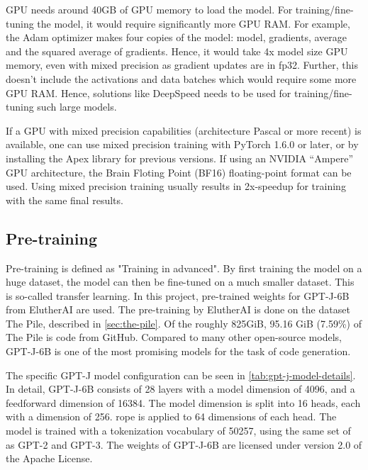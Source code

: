 GPU needs around 40GB of GPU memory to load the model. For training/fine-tuning the model, it would require significantly more GPU RAM. For example, the Adam optimizer makes four copies of the model: model, gradients, average and the squared average of gradients. Hence, it would take 4x model size GPU memory, even with mixed precision as gradient updates are in fp32. Further, this doesn't include the activations and data batches which would require some more GPU RAM. Hence, solutions like DeepSpeed needs to be used for training/fine-tuning such large models.

If a GPU with mixed precision capabilities (architecture Pascal or more recent) is available, one can use mixed precision training with PyTorch 1.6.0 or later, or by installing the Apex library for previous versions. If using an NVIDIA “Ampere” GPU architecture, the Brain Floting Point (BF16) floating-point format can be used. Using mixed precision training usually results in 2x-speedup for training with the same final results.

\subsection{Pre-training}
\label{sec:pretraining}
Pre-training is defined as "Training in advanced". By first training the model on a huge dataset, the model can then be fine-tuned on a much smaller dataset. This is so-called transfer learning. In this project, pre-trained weights for GPT-J-6B from ElutherAI are used. The pre-training by ElutherAI is done on the dataset The Pile, described in \cref{sec:the-pile}. Of the roughly 825GiB, 95.16 GiB (7.59\%) of The Pile is code from GitHub. Compared to many other open-source models, GPT-J-6B is one of the most promising models for the task of code generation.

The specific GPT-J model configuration can be seen in \cref{tab:gpt-j-model-details}. In detail, GPT-J-6B consists of 28 layers with a model dimension of 4096, and a feedforward dimension of 16384. The model dimension is split into 16 heads, each with a dimension of 256. \acrfull{rope} is applied to 64 dimensions of each head. The model is trained with a tokenization vocabulary of 50257, using the same set of  as GPT-2 and GPT-3. The weights of GPT-J-6B are licensed under version 2.0 of the Apache License.



